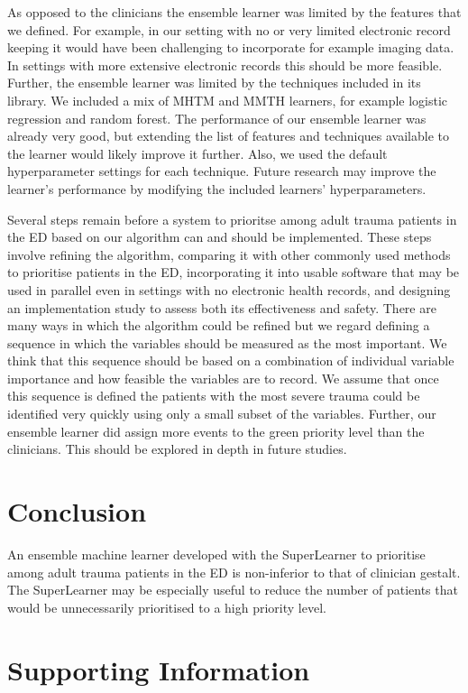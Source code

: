 \documentclass[10pt,letterpaper]{article}\usepackage[]{graphicx}\usepackage[]{color}
\begin{document}
As opposed to the clinicians the ensemble learner was limited by the features
that we defined. For example, in our setting with no or very limited electronic
record keeping it would have been challenging to incorporate for example imaging
data. In settings with more extensive electronic records this should be more
feasible. Further, the ensemble learner was limited by the techniques included
in its library. We included a mix of MHTM and MMTH learners, for example
logistic regression and random forest. The performance of our ensemble learner
was already very good, but extending the list of features and techniques
available to the learner would likely improve it further.  Also, we used the
default hyperparameter settings for each technique. Future research may improve
the learner's performance by modifying the included learners' hyperparameters.

Several steps remain before a system to prioritse among adult trauma patients in
the ED based on our algorithm can and should be implemented. These steps involve
refining the algorithm, comparing it with other commonly used methods to
prioritise patients in the ED, incorporating it into usable software that may be
used in parallel even in settings with no electronic health records, and
designing an implementation study to assess both its effectiveness and
safety. There are many ways in which the algorithm could be refined but we
regard defining a sequence in which the variables should be measured as the most
important. We think that this sequence should be based on a combination of
individual variable importance and how feasible the variables are to record. We
assume that once this sequence is defined the patients with the most severe
trauma could be identified very quickly using only a small subset of the
variables. Further, our ensemble learner did assign more events to the green
priority level than the clinicians. This should be explored in depth in future
studies.

\section*{Conclusion}
An ensemble machine learner developed with the SuperLearner to prioritise among
adult trauma patients in the ED is non-inferior to that of clinician
gestalt. The SuperLearner may be especially useful to reduce the number of
patients that would be unnecessarily prioritised to a high priority level.

\section*{Supporting Information}
\end{document}
